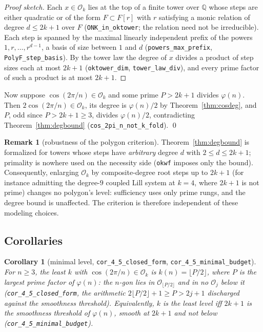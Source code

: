 \documentclass[11pt]{amsart}
\theoremstyle{plain}
\newtheorem{corollary}[theorem]{Corollary}
\theoremstyle{definition}
\newtheorem{remark}[theorem]{Remark}
\newcommand{\Ok}{\mathscr{O}_k}
\newcommand{\Onum}[1]{\mathscr{O}_{#1}}
\newcommand{\Q}{\mathbb{Q}}
\newcommand{\code}[1]{\texttt{#1}}
\begin{document}
\begin{proof}[Proof sketch]
Each $x \in \Ok$ lies at the top of a finite tower over $\Q$ whose steps are either quadratic or of the form $F \subset F[r]$ with $r$ satisfying a monic relation of degree $d \le 2k+1$ over $F$ (\code{ONK\_in\_oktower}; the relation need not be irreducible). Each step is spanned by the maximal linearly independent prefix of the powers $1, r, \dots, r^{d-1}$, a basis of size between $1$ and $d$ (\code{powers\_max\_prefix}, \code{PolyF\_step\_basis}). By the tower law the degree of $x$ divides a product of step sizes each at most $2k+1$ (\code{oktower\_dim}, \code{tower\_law\_div}), and every prime factor of such a product is at most $2k+1$.
\end{proof}

Now suppose $\cos(2\pi/n) \in \Ok$ and some prime $P > 2k+1$ divides $\varphi(n)$. Then $2\cos(2\pi/n) \in \Ok$, its degree is $\varphi(n)/2$ by Theorem~\ref{thm:cosdeg}, and $P$, odd since $P > 2k+1 \ge 3$, divides $\varphi(n)/2$, contradicting Theorem~\ref{thm:degbound} (\code{cos\_2pi\_n\_not\_k\_fold}). \qed

\begin{remark}[robustness of the polygon criterion]\label{rem:robust}
Theorem~\ref{thm:degbound} is formalized for towers whose steps have \emph{arbitrary} degree $d$ with $2 \le d \le 2k+1$; primality is nowhere used on the necessity side (\code{okwf} imposes only the bound). Consequently, enlarging $\Ok$ by composite-degree root steps up to $2k+1$ (for instance admitting the degree-$9$ coupled Lill system at $k=4$, where $2k+1$ is not prime) changes no polygon's level: sufficiency uses only prime rungs, and the degree bound is unaffected. The criterion is therefore independent of these modeling choices.
\end{remark}

\subsection{Corollaries}

\begin{corollary}[minimal level, \code{cor\_4\_5\_closed\_form}, \code{cor\_4\_5\_minimal\_budget}]\label{cor:budget}
For $n \ge 3$, the least $k$ with $\cos(2\pi/n) \in \Ok$ is $k(n) = \lfloor P/2 \rfloor$, where $P$ is the largest prime factor of $\varphi(n)$: the $n$-gon lies in $\Onum{\lfloor P/2 \rfloor}$ and in no $\Onum{j}$ below it (\code{cor\_4\_5\_closed\_form}, the arithmetic $2\lfloor P/2\rfloor + 1 \ge P > 2j+1$ discharged against the smoothness threshold). Equivalently, $k$ is the least level iff $2k+1$ is the smoothness threshold of $\varphi(n)$, smooth at $2k+1$ and not below (\code{cor\_4\_5\_minimal\_budget}).
\end{corollary}
\end{document}
